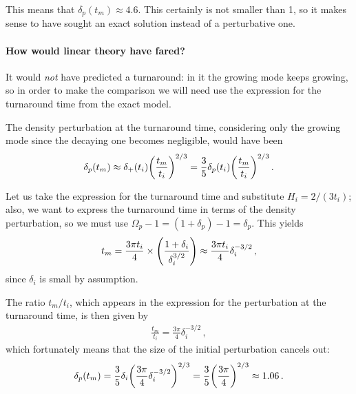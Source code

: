 \documentclass[main.tex]{subfiles}
\begin{document}
This means that \(\delta_{p}(t_m) \approx 4.6 \). This certainly is not smaller than 1, so it makes sense to have sought an exact solution instead of a perturbative one. 


\paragraph{How would linear theory have fared?}

It would \emph{not} have predicted a turnaround: in it the growing mode keeps growing, so in order to make the comparison we will need use the expression for the turnaround time from the exact model.

The density perturbation at the turnaround time, considering only the growing mode since the decaying one becomes negligible, would have been
%
\begin{align}
\delta_p (t_m) 
\approx \delta_{+}(t_i) \qty(\frac{t_m }{t_i})^{2/3} 
= \frac{3}{5} \delta_{p}(t_i) \qty(\frac{t_m}{t_i})^{2/3} 
\,.
\end{align}
%

Let us take the expression for the turnaround time and substitute \(H_i = 2/ (3 t_i)\); also, we want to express the turnaround time in terms of the density perturbation, so we must use \(\Omega _p - 1 = (1 + \delta _p) - 1 = \delta _p\). This yields
%
\begin{align}
t_m = \frac{3 \pi t_i}{4} \times \qty(\frac{1 + \delta_{i}}{ \delta_{i}^{3/2}}) \approx \frac{3 \pi t_i}{4} \delta_{i}^{-3/2}
\,,
\end{align}
%
since \(\delta _i\) is small by assumption.

The ratio \(t_m / t_i\), which appears in the expression for the perturbation at the turnaround time, is then given by
%
\begin{align}
\frac{t_m}{t_i} 
=\frac{3 \pi }{4} \delta_{i}^{-3/2}
\,,
\end{align}
%
which fortunately means that the size of the initial perturbation cancels out:
%
\begin{align}
\delta_{p}(t_m) =
\frac{3}{5} \delta_{i} \qty( \frac{3 \pi }{4} \delta_{i}^{-3/2})^{2/3}
=\frac{3}{5} \qty(\frac{3 \pi }{4})^{2/3} \approx 1.06
\,.
\end{align}
\end{document}
